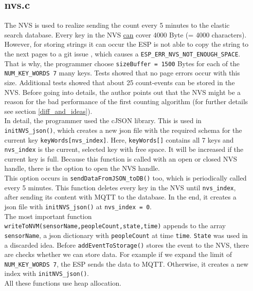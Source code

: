 \subsection{nvs.c}\label{nvs}
The NVS is used to realize sending the count every 5 minutes to the elastic search database.
Every key in the NVS \underline{can} cover 4000 Byte (= 4000 characters). However, for storing
strings it can occur the ESP is not able to copy the string to the next pages to a git issue
\cite{gitPagesNVS}, which causes a \verb!ESP_ERR_NVS_NOT_ENOUGH_SPACE!. That is why, the programmer
choose \verb!sizeBuffer = 1500! Bytes for each of the \verb!NUM_KEY_WORDS 7! many keys. Tests showed
that no page errors occur with this size. Additional tests showed that about
25 count-events can be stored in the NVS.
Before going into details, the author points out that the NVS might be a reason for the bad performance of
the first counting algorithm (for further details see section \ref{diff_and_ideas}).\\
In detail, the programmer used the cJSON library. This is used in \verb!initNVS_json()!, which creates
a new json file with the required schema for the current key \verb!keyWords[nvs_index]!.
Here, \verb!keyWords[]! contains all
7 keys and \verb!nvs_index! is the current, selected key with free space. It will be increased if the current key
is full.
Because this function is called with an open
or closed NVS handle, there is the option to open the NVS handle.\\
This option occurs in \verb!sendDataFromJSON_toDB()! too, which is periodically called every 5 minutes.
This function deletes every key in the NVS until \verb!nvs_index!,
after sending its content with MQTT to the database. In the end, it creates a json file with
\verb!initNVS_json()! at \verb!nvs_index = 0!.\\
The most important function \verb!writeToNVM(sensorName,peopleCount,state,time)! appends to
the array \verb!sensorName!, a json dictionary with \verb!peopleCount! at time \verb!time!.
\verb!State! was used in a discarded idea. Before \verb!addEventToStorage()!
stores the event to the NVS, there are checks whether we can store data.
For example if we expand the limit of \verb!NUM_KEY_WORDS 7!,
the ESP sends the data to MQTT. Otherwise, it creates a new index with \verb!initNVS_json()!.\\
All these functions use heap allocation.



